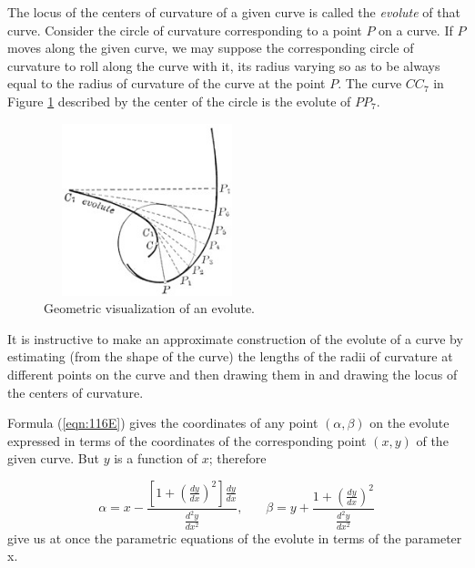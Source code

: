 The locus of the centers of curvature of a given curve is called 
the {\it evolute} of that curve. 
Consider the circle of curvature corresponding to a point $P$ on a curve. 
If $P$ moves along the given curve, we may suppose the corresponding 
circle of curvature to roll along the curve with it, its radius 
varying so as to be always equal to the radius of curvature 
of the curve at the point $P$. The curve $CC_7$ in Figure \ref{fig:evolutes}
described by the center of the circle is the evolute of $PP_7$.

\begin{figure}[h!]
\begin{minipage}{\textwidth}
\begin{center}
\includegraphics[height=5cm,width=6cm]{evolutes.eps}
\end{center}
\end{minipage}
\caption{Geometric visualization of an evolute.}
\label{fig:evolutes}
\end{figure}
 
\noindent
It is instructive to make an approximate construction of 
the evolute of a curve by estimating (from the shape of the 
curve) the lengths of the radii of curvature at different 
points on the curve and then drawing them in and drawing the 
locus of the centers of curvature.

Formula (\ref{eqn:116E}) %
gives the coordinates of any 
point $(\alpha,\beta)$ on the evolute expressed in terms of the coordinates 
of the corresponding point $(x,y)$ of the given curve. But 
$y$ is a function of $x$; therefore

\[
    \alpha 
= x - \frac{ \left[ 1 + \left( \frac{dy}{dx} \right)^2 \right] \frac{dy}{dx} }{ \frac{d^2 y}{dx^2} }, 
\ \  \ \ \ \ \ \ 
\beta = y + \frac{ 1 + \left( \frac{dy}{dx} \right)^2 }{ \frac{d^2 y}{dx^2} } 
\]
give us at once the parametric equations of the evolute in 
terms of the parameter x.

